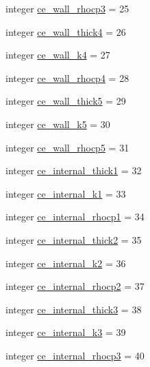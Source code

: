 \begin{DoxyCompactItemize}
\item 
integer \hyperlink{namespacecolnamesinputfiles_acecd5e35f648e623c67c755a16c81146}{ce\+\_\+wall\+\_\+rhocp3} = 25
\item 
integer \hyperlink{namespacecolnamesinputfiles_aa12b6be437a155499a81d68a25e63447}{ce\+\_\+wall\+\_\+thick4} = 26
\item 
integer \hyperlink{namespacecolnamesinputfiles_a52cea3d437fe4a2fbec39729693a7fa3}{ce\+\_\+wall\+\_\+k4} = 27
\item 
integer \hyperlink{namespacecolnamesinputfiles_a247ca03139e0f643e0fab6825f9bedc5}{ce\+\_\+wall\+\_\+rhocp4} = 28
\item 
integer \hyperlink{namespacecolnamesinputfiles_ade732387f6c5d5707bcfb29a36e9203f}{ce\+\_\+wall\+\_\+thick5} = 29
\item 
integer \hyperlink{namespacecolnamesinputfiles_aacda4c041fea54bf341a9e4916b71859}{ce\+\_\+wall\+\_\+k5} = 30
\item 
integer \hyperlink{namespacecolnamesinputfiles_ab0c099062633c353168b90905febfdcf}{ce\+\_\+wall\+\_\+rhocp5} = 31
\item 
integer \hyperlink{namespacecolnamesinputfiles_ab457b5625ff240f1f5f71cfda7a1c8c1}{ce\+\_\+internal\+\_\+thick1} = 32
\item 
integer \hyperlink{namespacecolnamesinputfiles_af7d4ccd873926b02dcb3ba262c3e2938}{ce\+\_\+internal\+\_\+k1} = 33
\item 
integer \hyperlink{namespacecolnamesinputfiles_a0a1ae13f900f9f991dd32b852e09ac85}{ce\+\_\+internal\+\_\+rhocp1} = 34
\item 
integer \hyperlink{namespacecolnamesinputfiles_ad505e7f33449caafe5d2dd32f66f2772}{ce\+\_\+internal\+\_\+thick2} = 35
\item 
integer \hyperlink{namespacecolnamesinputfiles_a9728065468298189ef5292b3dd006e70}{ce\+\_\+internal\+\_\+k2} = 36
\item 
integer \hyperlink{namespacecolnamesinputfiles_a9796b80c2df6508bc71243ddb0a76714}{ce\+\_\+internal\+\_\+rhocp2} = 37
\item 
integer \hyperlink{namespacecolnamesinputfiles_aa82cab095df0aee6ab3810d139463b12}{ce\+\_\+internal\+\_\+thick3} = 38
\item 
integer \hyperlink{namespacecolnamesinputfiles_aceb4df3d050c89160719c73160ce2cda}{ce\+\_\+internal\+\_\+k3} = 39
\item 
integer \hyperlink{namespacecolnamesinputfiles_a3515c594820c96b260a5c002e4dc61aa}{ce\+\_\+internal\+\_\+rhocp3} = 40
\item 

\end{DoxyCompactItemize}
